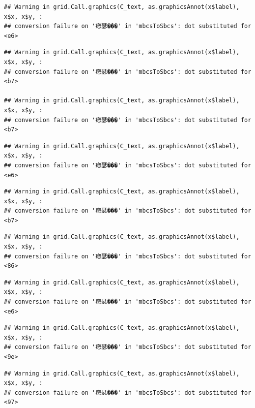 \documentclass[
]{article}
\begin{document}
\begin{verbatim}
## Warning in grid.Call.graphics(C_text, as.graphicsAnnot(x$label), x$x, x$y, :
## conversion failure on '瘛瑟���' in 'mbcsToSbcs': dot substituted for <e6>
\end{verbatim}

\begin{verbatim}
## Warning in grid.Call.graphics(C_text, as.graphicsAnnot(x$label), x$x, x$y, :
## conversion failure on '瘛瑟���' in 'mbcsToSbcs': dot substituted for <b7>

## Warning in grid.Call.graphics(C_text, as.graphicsAnnot(x$label), x$x, x$y, :
## conversion failure on '瘛瑟���' in 'mbcsToSbcs': dot substituted for <b7>
\end{verbatim}

\begin{verbatim}
## Warning in grid.Call.graphics(C_text, as.graphicsAnnot(x$label), x$x, x$y, :
## conversion failure on '瘛瑟���' in 'mbcsToSbcs': dot substituted for <e6>
\end{verbatim}

\begin{verbatim}
## Warning in grid.Call.graphics(C_text, as.graphicsAnnot(x$label), x$x, x$y, :
## conversion failure on '瘛瑟���' in 'mbcsToSbcs': dot substituted for <b7>
\end{verbatim}

\begin{verbatim}
## Warning in grid.Call.graphics(C_text, as.graphicsAnnot(x$label), x$x, x$y, :
## conversion failure on '瘛瑟���' in 'mbcsToSbcs': dot substituted for <86>
\end{verbatim}

\begin{verbatim}
## Warning in grid.Call.graphics(C_text, as.graphicsAnnot(x$label), x$x, x$y, :
## conversion failure on '瘛瑟���' in 'mbcsToSbcs': dot substituted for <e6>
\end{verbatim}

\begin{verbatim}
## Warning in grid.Call.graphics(C_text, as.graphicsAnnot(x$label), x$x, x$y, :
## conversion failure on '瘛瑟���' in 'mbcsToSbcs': dot substituted for <9e>
\end{verbatim}

\begin{verbatim}
## Warning in grid.Call.graphics(C_text, as.graphicsAnnot(x$label), x$x, x$y, :
## conversion failure on '瘛瑟���' in 'mbcsToSbcs': dot substituted for <97>
\end{verbatim}
\end{document}
